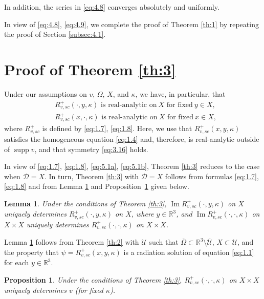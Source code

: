 \documentclass[10pt,a4paper]{amsart}
\DeclareMathOperator{\supp}{supp}
\newcommand{\RR}{\mathbb R}
\renewcommand{\Im}{\mathop{\mathrm{Im}}}
\newtheorem{lemma}{Lemma}
\newtheorem{proposition}{Proposition}
\theoremstyle{definition}
\begin{document}
In addition, the series in \eqref{eq:4.8} converges absolutely and uniformly.

In view of \eqref{eq:4.8}, \eqref{eq:4.9},
we complete the proof of Theorem \ref{th:1} by repeating the proof of Section \ref{subsec:4.1}.

\section{Proof of Theorem \ref{th:3}}\label{sec:5}


Under our assumptions on $v$, $\Omega$, $X$, and $\kappa$, we have, in particular, that
\begin{align}
&R_{v,sc}^+(\cdot, y, \kappa)\text{ is real-analytic on}\ X\text{ for fixed}\ y \in X, \label{eq:5.1a} \\
&R_{v,sc}^+(x, \cdot, \kappa)\text{ is real-analytic on}\ X\text{ for fixed}\ x \in X, \label{eq:5.1b}
\end{align}
where $R_{v,sc}^+$ is defined by \eqref{eq:1.7}, \eqref{eq:1.8}.
Here, we use that $R_{v,sc}^+(x, y, \kappa)$ satisfies the homogeneous equation \eqref{eq:1.4} and, therefore, is real-analytic outside of $\supp v$,
and that symmetry \eqref{eq:3.16} holds.

In view of \eqref{eq:1.7}, \eqref{eq:1.8}, \eqref{eq:5.1a}, \eqref{eq:5.1b}, Theorem \ref{th:3} reduces to the case when $\mathcal{D}=X$.
In turn, Theorem \ref{th:3} with $\mathcal{D}=X$ follows from formulas \eqref{eq:1.7}, \eqref{eq:1.8} and from Lemma \ref{lem:1} and Proposition~\ref{prop:2} given below.

\begin{lemma}\label{lem:1}
Under the conditions of Theorem \ref{th:3}, $\Im R_{v,sc}^+(\cdot, y, \kappa)$ on $X$ uniquely determines $R_{v,sc}^+(\cdot, y, \kappa)$ on $X$,
where $y \in \RR^3$, and $\Im R_{v,sc}^+(\cdot, \cdot, \kappa)$ on $X\times X$ uniquely determines $R_{v,sc}^+(\cdot, \cdot, \kappa)$ on $X\times X$.
\end{lemma}

Lemma \ref{lem:1} follows from Theorem \ref{th:2} with $\mathcal U$ such that $\overline {\Omega} \subset \RR^3\setminus \overline {\mathcal{U}}$, $X \subset \mathcal U$, and
the property that $\psi=R_{v,sc}^+(x, y, \kappa)$ is a radiation solution of equation \eqref{eq:1.1} for each $y\in \RR^3$.

\begin{proposition}\label{prop:2}
Under the conditions of Theorem \ref{th:3}, $R_{v,sc}^+(\cdot, \cdot, \kappa)$ on $X\times X$ uniquely determines $v$ (for fixed $\kappa$).
\end{proposition}
\end{document}
